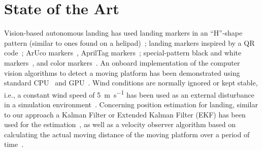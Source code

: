 \documentclass[conference]{IEEEtran}
\begin{document}
\section{State of the Art}
\label{sec:state-of-the-art}

\newcommand{\Xcite}[1]{}


Vision-based autonomous landing has used landing markers
 in an ``H''-shape
pattern (similar to ones found on a helipad)~\cite{saripalli2002vision};
landing markers inspired by a QR code~\cite{yuan2018hierarchical};
ArUco markers~\cite{lee2012autonomous}\Xcite{yang2018hybrid}, AprilTag markers~\cite{araar2017vision}\Xcite{kyristsis2016towards,feng2018autonomous,olson2011apriltag}; special-pattern black and white markers~\cite{nguyen2018lightdenseyolo}\Xcite{falanga2017vision}, and color markers~\cite{chen2016system}\Xcite{lee2016vision}.  
An onboard implementation of the computer vision algorithms to detect a moving platform has been demonstrated using standard CPU~\cite{chen2016system}\Xcite{lee2016vision,falanga2017vision} and GPU~\cite{yang2018hybrid}\Xcite{nguyen2018lightdenseyolo,kyristsis2016towards}.
% 
Wind conditions are normally ignored or kept stable, i.e.,
a constant wind speed of \SI{5}{\m \per \s} has been used as an external disturbance in a
simulation environment~\cite{feng2018autonomous}. 
%
Concerning %
position estimation for landing,
similar to our approach a Kalman Filter or Extended Kalman Filter (EKF) has been used for the
estimation~\cite{saripalli2003landing}\Xcite{araar2017vision,feng2018autonomous,
  falanga2017vision}, as well as a velocity observer algorithm based on calculating the actual
moving distance of the moving platform over a period of time~\cite{yang2018hybrid}.
\end{document}

